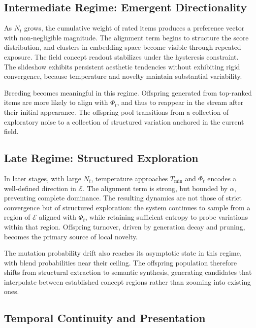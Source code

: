 \documentclass[12pt, a4paper]{article}
\theoremstyle{definition}
\begin{document}
\subsection{Intermediate Regime: Emergent Directionality}

As $N_t$ grows, the cumulative weight of rated items produces a preference vector with non-negligible magnitude. The alignment term begins to structure the score distribution, and clusters in embedding space become visible through repeated exposure. The field concept readout stabilizes under the hysteresis constraint. The slideshow exhibits persistent aesthetic tendencies without exhibiting rigid convergence, because temperature and novelty maintain substantial variability.

Breeding becomes meaningful in this regime. Offspring generated from top-ranked items are more likely to align with $\Phi_t$, and thus to reappear in the stream after their initial appearance. The offspring pool transitions from a collection of exploratory noise to a collection of structured variation anchored in the current field.

\subsection{Late Regime: Structured Exploration}

In later stages, with large $N_t$, temperature approaches $T_{\min}$ and $\Phi_t$ encodes a well-defined direction in $\mathcal{E}$. The alignment term is strong, but bounded by $\alpha$, preventing complete dominance. The resulting dynamics are not those of strict convergence but of structured exploration: the system continues to sample from a region of $\mathcal{E}$ aligned with $\Phi_t$, while retaining sufficient entropy to probe variations within that region. Offspring turnover, driven by generation decay and pruning, becomes the primary source of local novelty.

The mutation probability drift also reaches its asymptotic state in this regime, with blend probabilities near their ceiling. The offspring population therefore shifts from structural extraction to semantic synthesis, generating candidates that interpolate between established concept regions rather than zooming into existing ones.

\subsection{Temporal Continuity and Presentation}
\end{document}
